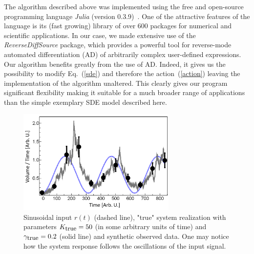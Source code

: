\documentclass[12pt,a4paper,final]{iopart}
\begin{document}
The algorithm described above was implemented using the free and open-source programming language \emph{Julia} (version 0.3.9)~\cite{julia_web}. One of the attractive features of the language is its (fast growing) library of over 600 packages for numerical and scientific applications.
In our case, we made extensive use of the \emph{ReverseDiffSource} package, which provides a powerful tool for reverse-mode automated differentiation (AD) of arbitrarily complex user-defined expressions. Our algorithm benefits greatly from the use of AD. Indeed, it gives us the possibility to modify Eq.~(\ref{sde}) and therefore the action~(\ref{action}) leaving the implementation of the algorithm unaltered. This clearly gives our program significant flexibility making it suitable for a much broader range of applications than the simple exemplary SDE model described here.
%
\begin{figure}[htb!]
    \centering
    \includegraphics[width=0.7\textwidth]{Figs/FigRainData.png}
    \caption{\label{fig:rain_data_S}Sinusoidal input $r(t)$ (dashed line), "true" system realization with parameters $K_{\mbox{\small true}} = 50$ (in some arbitrary units of time) and $\gamma_{\mbox{\small true}} = 0.2$ (solid line) and synthetic observed data. One may notice how the system response follows the oscillations of the input signal.}
\end{figure}
\end{document}
